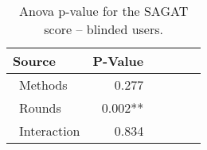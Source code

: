 
\begin{table}[!htb]
\centering
\caption{Anova p-value for the SAGAT score -- blinded users.}
\label{tab:blocanova_sagat_avg_two_way_blind}
\begin{tabular}{lrrrrr}
\toprule
          Source & P-Value \\
\midrule
    \    Methods &   0.277 \\
     \    Rounds & 0.002** \\
\    Interaction &   0.834 \\
\bottomrule
\end{tabular}
\end{table}

